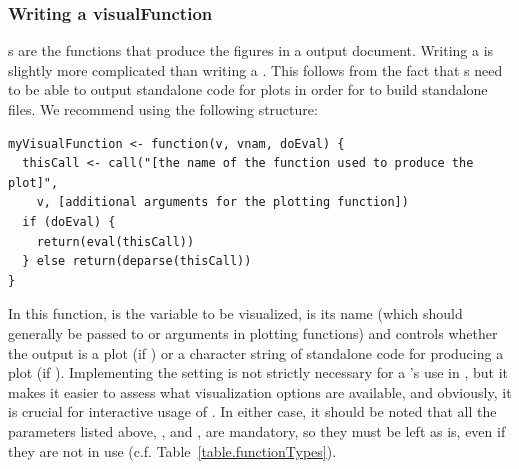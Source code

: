 \documentclass[article,shortnames]{jss}
\begin{document}




\subsubsection{Writing a visualFunction}
s are the functions that produce the figures in a
 output document. Writing a  is slightly
more complicated than writing a . This follows from
the fact that s need to be able to output standalone
code for plots in order for  to build standalone
 files. We recommend using the following structure:
\begin{Verbatim}
myVisualFunction <- function(v, vnam, doEval) {
  thisCall <- call("[the name of the function used to produce the plot]",
    v, [additional arguments for the plotting function])
  if (doEval) {
    return(eval(thisCall))
  } else return(deparse(thisCall))
}
\end{Verbatim}

In this function,  is the variable to be visualized,
 is its name (which should generally be passed to
 or  arguments in plotting functions) and
 controls whether the output is a plot (if )
or a character string of standalone code for producing a plot (if
). Implementing the  setting is not
strictly necessary for a 's use in , but
it makes it easier to assess what visualization options are available,
and obviously, it is crucial for interactive usage of
. In either case, it should be noted that all
the parameters listed above, ,  and ,
are mandatory, so they must be left as is, even if they are not in
use (c.f. Table~\ref{table.functionTypes}).
\end{document}
